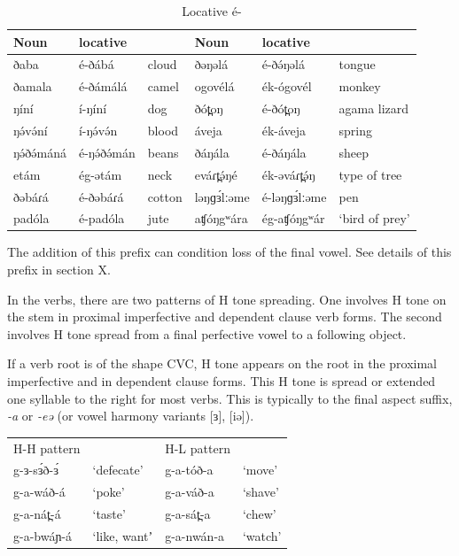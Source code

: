 \begin{table}
	\begin{tabular}[t]{llllll}
Noun	&	locative		&	&			Noun		&	locative		&	\\\hline
ðaba	&	é-ðábá		&	cloud	&	ðəŋəlá	&	é-ðə́ŋəlá		&	tongue\\
ðamala	&	é-ðámálá	&	camel	&	ogovélá	&	ék-ógovél	&	monkey\\
ŋíní 	&	í-ŋíní		&	dog		&	ðót̪oŋ 	&	é-ðót̪oŋ		&	agama lizard\\
ŋə́və́ní	&	í-ŋə́və́n		&	blood	&	áveja	&	ék-áveja		&	spring\\
ŋə́ðə́máná	&	é-ŋə́ðə́mán		&	beans	&	ðáŋála	&	é-ðáŋála	&	sheep\\
etám	&	ég-ətám		&	neck		&	eváɾt̪ə́ŋé	&	ék-əváɾt̪ə́ŋ	&	type of tree\\
ðəbáɾá	&	é-ðəbáɾá	&	cotton	&	ləŋɡɜ́lːəme	&	é-ləŋɡɜ́lːəme	&	pen\\
padóla	&	é-padóla	&	jute		&	aʧóŋgʷára	&	ég-aʧóŋgʷár	&	‘bird of prey’\\
	\end{tabular}
	\caption{Locative é-}
	\label{tab:ch4:3}
\end{table}

The addition of this prefix can condition loss of the final vowel. See details of this prefix in section X.

In the verbs, there are two patterns of H tone spreading. One involves H tone on the stem in proximal imperfective and dependent clause verb forms. The second involves H tone spread from a final perfective vowel to a following object. 

If a verb root is of the shape CVC, H tone appears on the root in the proximal imperfective and in dependent clause forms. This H tone is spread or extended one syllable to the right for most verbs. This is typically to the final aspect suffix, \textit{-a} or \textit{-eə} (or vowel harmony variants [ɜ], [iə]). 

\ea
\begin{tabular}[t]{llll}
H-H pattern		&				&	H-L pattern		&	\\
g-ɜ-sɜ́ð-ɜ́		&	‘defecate’	&	g-a-tóð-a		&	‘move’\\
g-a-wáð-á		&	‘poke’		&	g-a-váð-a 		&	‘shave’\\
g-a-nát̪-á		&	‘taste’		&	g-a-sát̪-a		&	‘chew’\\
g-a-bwáɲ-á		&	‘like, wantʼ	&	g-a-nwán-a		&	‘watch’\\
\end{tabular}
\z

